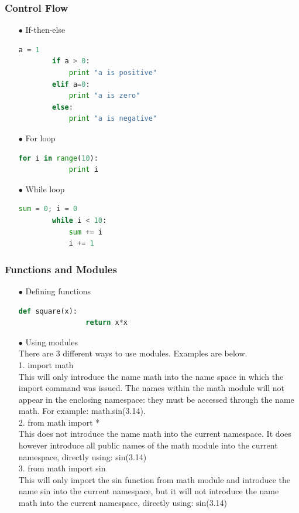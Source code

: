 
\begin{frame}[fragile]
  \MyLogo
  \frametitle{Control Flow}  
\small

\begin{itemize}
	\item[$\bullet$] If-then-else
	\begin{lstlisting}[language=python]
		a = 1
		if a > 0:
			print "a is positive"
		elif a=0:
			print "a is zero"
		else:
			print "a is negative"
	\end{lstlisting}			
	\item[$\bullet$] For loop
	\begin{lstlisting}[language=python]
		for i in range(10):
			print i
	\end{lstlisting}	
	\item[$\bullet$] While loop
	\begin{lstlisting}[language=python]
		sum = 0; i = 0
		while i < 10:
			sum += i
			i += 1
	\end{lstlisting}
\end{itemize}

\end{frame}


\begin{frame}[fragile]
  \MyLogo
  \frametitle{Functions and Modules}  
\small

\begin{itemize}
	\item[$\bullet$] Defining functions 
		\begin{lstlisting}[language=python]
			def square(x):
				return x*x
		\end{lstlisting}		
	\item[$\bullet$] Using modules\\
			There are 3 different ways to use modules. Examples are below.\\
			1. import math\\
				This will only introduce the name math into the name space in which the import command was issued. The names within the math module will not appear in the enclosing namespace: they must be accessed through the name math. For example: math.sin(3.14).\\
			2. from math import *\\
				This does not introduce the name math into the current namespace. It does however introduce all public names of the math module into the current namespace, directly using: sin(3.14)\\
			3. from math import sin\\
				This will only import the sin function from math module and introduce the name sin into the current namespace, but it will not introduce the name math into the current namespace, directly using: sin(3.14)
		
\end{itemize}

\end{frame}
